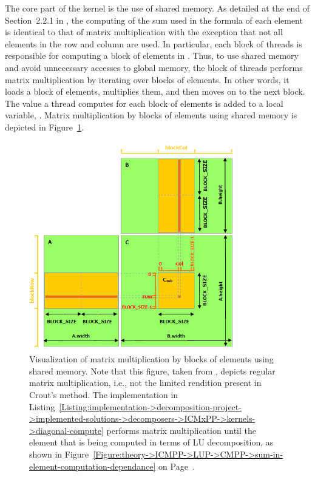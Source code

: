 The core part of the kernel is the use of shared memory.
As detailed at the end of Section~2.2.1 in  \cite{Cejka2022}, the computing of the sum used in the formula of each element is identical to that of matrix multiplication with the exception that not all elements in the row and column are used.
In particular, each block of threads is responsible for computing a block of elements in .
Thus, to use shared memory and avoid unnecessary accesses to global memory, the block of threads performs matrix multiplication by iterating over blocks of elements.
In other words, it loads a block of elements, multiplies them, and then moves on to the next block.
The value a thread computes for each block of elements is added to a local variable, .
Matrix multiplication by blocks of elements using shared memory is depicted in Figure~\ref{Figure:implementation->decomposition-project->implemented-solutions->decomposers->ICMxPP->CUDA-matrix-multiplication-with-shared-memory}.

\begin{figure}[ht!]
	\centering
	\includegraphics[width=0.8\textwidth, keepaspectratio]{images/ch02/CUDA-matrix-multiplication-by-blocks-using-shared-memory.png}
	\caption{Visualization of matrix multiplication by blocks of elements using shared memory.
		Note that this figure, taken from  \cite{NVIDIADecember2022}, depicts regular matrix multiplication, i.e., not the limited rendition present in Crout's method.
		The implementation in Listing~\ref{Listing:implementation->decomposition-project->implemented-solutions->decomposers->ICMxPP->kernels->diagonal-compute} performs matrix multiplication until the element that is being computed in terms of LU decomposition, as shown in Figure~\ref{Figure:theory->ICMPP->LUP->CMPP->sum-in-element-computation-dependance} on Page~\pageref{Figure:theory->ICMPP->LUP->CMPP->sum-in-element-computation-dependance}.
	}
	\label{Figure:implementation->decomposition-project->implemented-solutions->decomposers->ICMxPP->CUDA-matrix-multiplication-with-shared-memory}
\end{figure}

